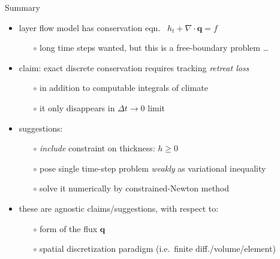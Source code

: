 \documentclass{beamer}
\newcommand\bq{\mathbf{q}}
\newcommand{\Div}{\nabla\cdot}
\begin{document}
\begin{frame}{Summary}

  \begin{itemize}
  \item layer flow model has conservation eqn. \, $h_t + \Div\bq = f$
    \begin{itemize}
    \item[$\circ$]  long time steps wanted, but this is a free-boundary problem \dots
    \end{itemize}
  \item claim: exact discrete conservation requires tracking \emph{retreat loss}
    \begin{itemize}
    \item[$\circ$] in addition to computable integrals of climate
    \item[$\circ$] it only disappears in $\Delta t\to 0$ limit
    \end{itemize}
  \item suggestions:
    \begin{itemize}
    \item[$\circ$]  \emph{include} constraint on thickness: $h\ge 0$
    \item[$\circ$]  pose single time-step problem \emph{weakly} as variational inequality
    \item[$\circ$]  solve it numerically by constrained-Newton method
    \end{itemize}
  \item these are agnostic claims/suggestions, with respect to:
    \begin{itemize}
    \item[$\circ$]  form of the flux $\bq$
    \item[$\circ$]  spatial discretization paradigm (i.e.~finite diff./volume/element)
    \end{itemize}
  \end{itemize}

\begin{center}
\end{center}

\end{frame}
\end{document}
